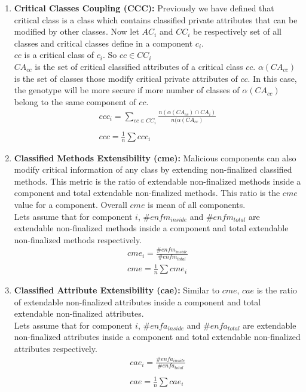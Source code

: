 \documentclass[letterpaper, 10 pt, conference]{ieeeconf}  %
\begin{document}
\begin{enumerate}
\item \textbf{Critical Classes Coupling (CCC):} Previously we have defined that critical class is a class which  contains classified private attributes that can be modified by other classes. Now let  $AC_{i}$ and $CC_{i}$ be respectively  set of all classes and critical classes define in a component $c_{i}$. \\
$cc$ is a critical class of $c_{i}$.
So $cc \in CC_{i}$ \\
$CA_{cc}$ is the set of critical classified attributes of a critical class $cc$. $\alpha(CA_{cc})$ is the set of classes those modify critical private attributes of $cc$. In this case, the genotype will be more secure if  more number of classes of $\alpha(CA_{cc})$ belong to the same component of $cc$.
\begin{equation}\label{ccc_eq}
 \begin{array}{l}
ccc_{i}=\sum_{cc \in CC_{i}}{\frac{n(\alpha(CA_{cc}) \cap CA_{i})}{n(\alpha(CA_{cc})}}\\\\
ccc=\frac{1}{n}\sum{ccc_{i}}
\end{array}
\end{equation}

\item \textbf{Classified Methods Extensibility (cme):} 
Malicious components can also modify critical information of any class by extending non-finalized classified methods. This metric is the ratio of extendable non-finalized methods inside a component and total extendable non-finalized methods. This ratio is the $cme$ value for a component. Overall $cme$ is mean of all components.\\
Lets assume that for component $i$, $\#enfm_{inside}$ and $\#enfm_{total}$ are  extendable non-finalized methods inside a component and total extendable non-finalized methods respectively.
\begin{equation}\label{cme_eq}
 \begin{array}{l}
cme_{i}=\frac{\#enfm_{inside}}{\#enfm_{total}} \\
cme=\frac{1}{n}\sum{cme_i}
\end{array}
\end{equation}


\item \textbf{Classified Attribute Extensibility (cae):}
Similar to $cme$, $cae$ is the ratio of extendable non-finalized attributes inside a component and total extendable non-finalized attributes.\\
Lets assume that for component $i$, $\#enfa_{inside}$ and $\#enfa_{total}$ are  extendable non-finalized attributes inside a component and total extendable non-finalized attributes respectively.
\begin{equation}\label{cae_eq}
 \begin{array}{l}
cae_{i}=\frac{\#enfa_{inside}}{\#enfa_{total}} \\\\
cae=\frac{1}{n}\sum{cae_i}
\end{array}
\end{equation}


  
\end{enumerate}
\end{document}
